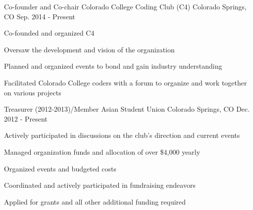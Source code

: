 


\begin{cventries}


\vspace{-.25em}
\cventry
{Co-founder and Co-chair} %
{Colorado College Coding Club (C4)} %
{Colorado Springs, CO} %
{Sep. 2014 - Present} %
{ %
\begin{cvitems}
\item {Co-founded and organized C4}
\item {Oversaw the development and vision of the organization}
\item {Planned and organized events to bond and gain industry understanding}
\item {Facilitated Colorado College coders with a forum to organize and work together on various projects}
\end{cvitems}
}


\vspace{-1.25em}
\cventry
{Treasurer (2012-2013)/Member} %
{Asian Student Union} %
{Colorado Springs, CO} %
{Dec. 2012 - Present} %
{ %
\begin{cvitems}
\item {Actively participated in discussions on the club's direction and current events}
\item {Managed organization funds and allocation of over \$4,000 yearly}
\item {Organized events and budgeted costs}
\item {Coordinated and actively participated in fundraising endeavors}
\item {Applied for grants and all other additional funding required}
\end{cvitems}
}


\end{cventries}
